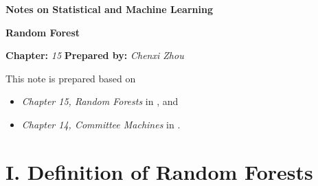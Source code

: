 \documentclass[12pt]{article}
\newcommand{\titlebox}[4]{
\begin{tcolorbox}[colback = blue!5!white!95, colframe = blue!70!black
]
  \noindent \textbf{ #1 } \hfill \textit{#2} 
  \begin{center}
  	 \LARGE{\textbf{#3}}
  \end{center}
\textbf{Chapter:} \textit{#4} \hfill \textbf{Prepared by:} \textit{Chenxi Zhou}
\end{tcolorbox}
}
\begin{document}
\titlebox{Notes on Statistical and Machine Learning}{}{Random Forest}{15}
\thispagestyle{plain}

\vspace{10pt}

This note is prepared based on 
\begin{itemize}
	\item \textit{Chapter 15, Random Forests} in \textcite{Friedman2001-np}, and 
	\item \textit{Chapter 14, Committee Machines} in \textcite{Izenman2009-jk}. 
\end{itemize}


\section*{I. Definition of Random Forests} 
\end{document}
